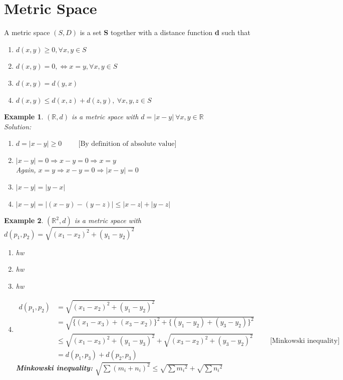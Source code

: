 \documentclass{article}
\newtheorem{example}{Example}[section]
\newcommand{\Rw}{\Rightarrow}
\newcommand{\hs}{\hspace}
\newcommand{\vs}{\vspace}
\newcommand{\ds}{\displaystyle}
\begin{document}
\section{Metric Space}
A metric space $(S,D)$ is a set \textbf{S} together with a distance function \textbf{d} such that
\begin{enumerate}
    \item $d(x,y)\geq 0, \forall x,y \in S$
    \item $d(x,y)=0, \Leftrightarrow x=y, \forall x,y \in S$
    \item $d(x,y) = d(y,x)$
    \item $d(x,y)\leq d(x,z)+d(z,y),\ \forall x,y,z \in S$
\end{enumerate}
\vs{0.75cm}
\begin{example}
    $(\mathbb{R},d)$ is a metric space with $d=|x-y| \ \forall x,y \in \mathbb{R}$\\
    \textit{Solution:} 
    \begin{enumerate}
        \item $d=|x-y| \geq 0 \hs{1cm}\text{[By definition of absolute value]}$
        \item $|x-y|=0 \Rw x-y=0 \Rw x=y$\\
        Again, $x=y \Rw x-y=0 \Rw |x-y|=0$
        \item $|x-y|=|y-x|$
        \item $|x-y|=|(x-y)-(y-z)|\leq |x-z|+|y-z|$ 
    \end{enumerate}
\end{example}
\vs{0.75cm}
\begin{example}
    $(\mathbb{R}^2,d)$ is a metric space with $\ds d(p_1,p_2)=\sqrt{(x_1-x_2)^2+(y_1-y_2)^2}$
    \begin{enumerate}
        \item hw
        \item hw
        \item hw
        \item 
        \begin{align*}\ds
            d(p_1,p_2)&=\sqrt{(x_1-x_2)^2+(y_1-y_2)^2}\\
            &=\sqrt{\{(x_1-x_3)+(x_3-x_2)\}^2+\{(y_1-y_2)+(y_3-y_2)\}^2}\\
            &\leq \sqrt{(x_1-x_3)^2+(y_1-y_3)^2}+\sqrt{(x_3-x_2)^2+(y_3-y_2)^2}\hs{1cm}\text{[Minkowski inequality]}\\
            &= d(p_1,p_3)+d(p_2,p_3)
        \end{align*}
        \textbf{Minkowski inequality:} $\sqrt{\sum (m_i+n_i)^2}\leq \sqrt{\sum {m_i}^2}+\sqrt{\sum {n_i}^2}$
    \end{enumerate}
\end{example}
\end{document}

